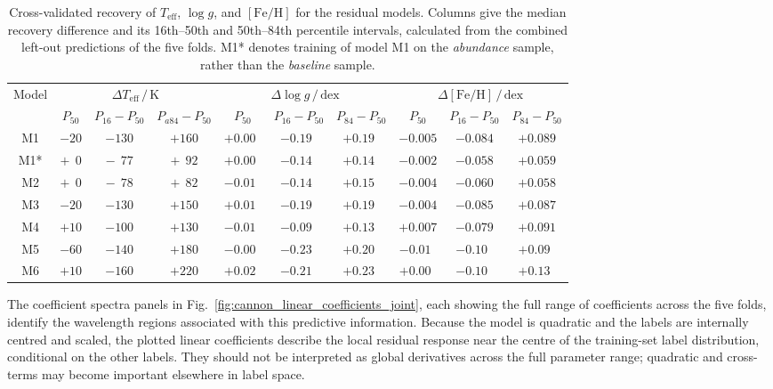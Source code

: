 \documentclass[twocolumn,apj,numberedappendix,appendixfloats]{openjournal}
\begin{document}
\begin{table}
    \centering
    \caption{Cross-validated recovery of $T_\mathrm{eff}$, $\log g$, and $[\mathrm{Fe/H}]$ for the residual models. Columns give the median recovery difference and its 16th--50th and 50th--84th percentile intervals, calculated from the combined left-out predictions of the five folds. \textcolor{M1}{M1*} denotes training of model \textcolor{M1}{M1} on the \textit{abundance} sample, rather than the \textit{baseline} sample.}   
    \label{tab:recovery_performance}
    \begin{tabular}{cccccccccc}
    \hline \hline
    Model 
    & \multicolumn{3}{c}{$\Delta T_\mathrm{eff}\,/\,\mathrm{K}$}
    & \multicolumn{3}{c}{$\Delta\log g\,/\,\mathrm{dex}$}
    & \multicolumn{3}{c}{$\Delta[\mathrm{Fe/H}]\,/\,\mathrm{dex}$} \\
    & $P_{50}$ & $P_{16}-P_{50}$ & $P_{a84}-P_{50}$
    & $P_{50}$ & $P_{16}-P_{50}$ & $P_{84}-P_{50}$
    & $P_{50}$ & $P_{16}-P_{50}$ & $P_{84}-P_{50}$ \\
    \hline
    \textcolor{M1}{M1}  & $-20$  & $-130$  & $+160$  & $+0.00~~$ & $-0.19~~$ & $+0.19~~$ & $-0.005$  & $-0.084$  & $+0.089$  \\
    \textcolor{M1}{M1*} & $+~~0$ & $-~~77$ & $+~~92$ & $+0.00~~$ & $-0.14~~$ & $+0.14~~$ & $-0.002$  & $-0.058$  & $+0.059$ \\
    \textcolor{M2}{M2}  & $+~~0$ & $-~~78$ & $+~~82$ & $-0.01~~$ & $-0.14~~$ & $+0.15~~$ & $-0.004$  & $-0.060$  & $+0.058$  \\
    \textcolor{M3}{M3}  & $-20$  & $-130$  & $+150$  & $+0.01~~$ & $-0.19~~$ & $+0.19~~$ & $-0.004$  & $-0.085$  & $+0.087$  \\
    \textcolor{M4}{M4}  & $+10$  & $-100$  & $+130$  & $-0.01~~$ & $-0.09~~$ & $+0.13~~$ & $+0.007$  & $-0.079$  & $+0.091$  \\
    \textcolor{M5}{M5}  & $-60$  & $-140$  & $+180$  & $-0.00~~$ & $-0.23~~$ & $+0.20~~$ & $-0.01~~$ & $-0.10~~$ & $+0.09~~$ \\
    \textcolor{M6}{M6}  & $+10$  & $-160$  & $+220$  & $+0.02~~$ & $-0.21~~$ & $+0.23~~$ & $+0.00~~$ & $-0.10~~$ & $+0.13~~$ \\    
    \hline \hline
    \end{tabular}
\end{table}

The coefficient spectra panels in Fig.~\ref{fig:cannon_linear_coefficients_joint}, each showing the full range of coefficients across the five folds, identify the wavelength regions associated with this predictive information. Because the model is quadratic and the labels are internally centred and scaled, the plotted linear coefficients describe the local residual response near the centre of the training-set label distribution, conditional on the other labels. They should not be interpreted as global derivatives across the full parameter range; quadratic and cross-terms may become important elsewhere in label space.
\end{document}
